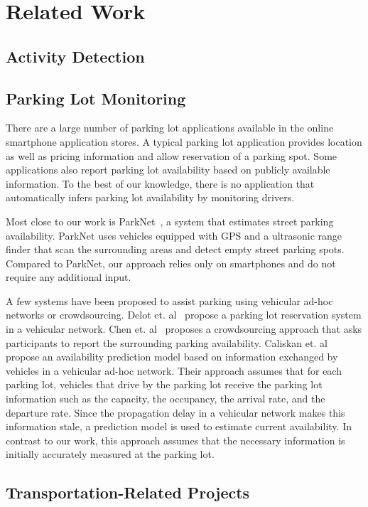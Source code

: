 \section{Related Work}
\label{sec-related}

\subsection{Activity Detection}

\subsection{Parking Lot Monitoring}

There are a large number of parking lot applications available in the online
smartphone application stores. A typical parking lot application provides
location as well as pricing information and allow reservation of a parking spot.
Some applications also report parking lot availability based on publicly
available information. To the best of our knowledge, there is no application
that automatically infers parking lot availability by monitoring drivers.

Most close to our work is ParkNet~\cite{Mathur:2010:PDS}, a system that
estimates street parking availability. ParkNet uses vehicles equipped with GPS
and a ultrasonic range finder that scan the surrounding areas and detect
empty street parking spots. Compared to ParkNet, our approach relies only on
smartphones and do not require any additional input.

A few systems have been proposed to assist parking using vehicular ad-hoc
networks or crowdsourcing. Delot et. al~\cite{Delot:2009:CRP} propose a parking
lot reservation system in a vehicular network. Chen et. al~\cite{Chen:2012:COS}
proposes a crowdsourcing approach that asks participants to report the
surrounding parking availability. Caliskan et. al~\cite{4212497} propose an
availability prediction model based on information exchanged by vehicles in a
vehicular ad-hoc network. Their approach assumes that for each parking lot,
vehicles that drive by the parking lot receive the parking lot information such
as the capacity, the occupancy, the arrival rate, and the departure rate. Since
the propagation delay in a vehicular network makes this information stale, a
prediction model is used to estimate current availability. In contrast to
our work, this approach assumes that the necessary information is initially
accurately measured at the parking lot.

\subsection{Transportation-Related Projects}
